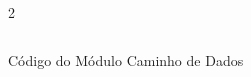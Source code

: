 \begin{figure}[H]
    \centering   
    \begin{tcolorbox}  
        \begin{multicols}{2} 
        \fontsize{9pt}{9pt}\selectfont\inputminted[obeytabs=true,tabsize=4,xleftmargin=20pt,linenos,breaklines]{VHDL}{VHDL/files/DataPath.vhd}    
        \end{multicols}
    \end{tcolorbox}
    \caption{Código do Módulo Caminho de Dados}
\end{figure}